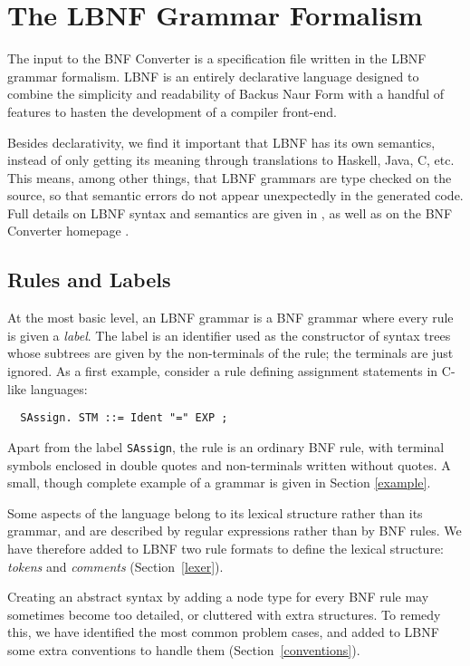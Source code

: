 \section{The LBNF Grammar Formalism}

\label{lbnf}

The input to the BNF Converter is a specification file written in the 
LBNF grammar formalism. LBNF is an entirely declarative 
language designed to combine the simplicity and readability of 
Backus Naur Form with a handful of features to hasten the development of 
a compiler front-end.

Besides declarativity, we find it important that LBNF has its
own semantics, instead of only getting its meaning through
translations to Haskell, Java, C, etc. This means, among other
things, that LBNF grammars are type checked on the source,
so that semantic errors do not appear unexpectedly in the generated
code. Full details on LBNF syntax and semantics are given in \cite{bnfc},
as well as on the BNF Converter homepage \cite{bnfcsite}.



\subsection{Rules and Labels}

At the most basic level, an LBNF grammar is a BNF grammar where 
every rule is given a {\em label}. The label is an identifier 
used as the constructor of syntax trees whose subtrees are 
given by the non-terminals of the rule; the terminals are just ignored.
As a first example, 
consider a rule defining assignment statements in C-like languages:
\begin{verbatim}
  SAssign. STM ::= Ident "=" EXP ;
\end{verbatim}
Apart from the label {\tt SAssign},
the rule is an ordinary BNF rule, with terminal symbols enclosed in
double quotes and non-terminals written without quotes. A small, though 
complete example of a grammar is given in Section \ref{example}.

Some aspects of the language belong to its lexical
structure rather than its grammar, and are described by
regular expressions rather than by BNF rules. We have therefore
added to LBNF two rule formats to define the lexical structure: 
{\em tokens} and {\em comments} (Section~\ref{lexer}).

Creating an abstract syntax by adding a node type for every BNF rule
may sometimes become too detailed, 
or cluttered with extra structures. 
To remedy this, we have identified the most common problem cases, 
and added to LBNF
some extra conventions to handle them (Section~\ref{conventions}).


